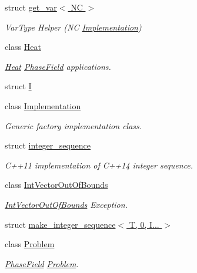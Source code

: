 \begin{DoxyCompactItemize}
struct \hyperlink{structUintah_1_1PhaseField_1_1get__var_3_01NC_01_4}{get\+\_\+var$<$ N\+C $>$}
\begin{DoxyCompactList}\small\item\em Var\+Type Helper (NC \hyperlink{classUintah_1_1PhaseField_1_1Implementation}{Implementation}) \end{DoxyCompactList}\item 
class \hyperlink{classUintah_1_1PhaseField_1_1Heat}{Heat}
\begin{DoxyCompactList}\small\item\em \hyperlink{classUintah_1_1PhaseField_1_1Heat}{Heat} \hyperlink{namespaceUintah_1_1PhaseField}{Phase\+Field} applications. \end{DoxyCompactList}\item 
struct \hyperlink{structUintah_1_1PhaseField_1_1I}{I}
\item 
class \hyperlink{classUintah_1_1PhaseField_1_1Implementation}{Implementation}
\begin{DoxyCompactList}\small\item\em Generic factory implementation class. \end{DoxyCompactList}\item 
struct \hyperlink{structUintah_1_1PhaseField_1_1integer__sequence}{integer\+\_\+sequence}
\begin{DoxyCompactList}\small\item\em C++11 implementation of C++14 integer sequence. \end{DoxyCompactList}\item 
class \hyperlink{classUintah_1_1PhaseField_1_1IntVectorOutOfBounds}{Int\+Vector\+Out\+Of\+Bounds}
\begin{DoxyCompactList}\small\item\em \hyperlink{classUintah_1_1PhaseField_1_1IntVectorOutOfBounds}{Int\+Vector\+Out\+Of\+Bounds} Exception. \end{DoxyCompactList}\item 
struct \hyperlink{structUintah_1_1PhaseField_1_1make__integer__sequence_3_01T_00_010_00_01I_8_8_8_01_4}{make\+\_\+integer\+\_\+sequence$<$ T, 0, I... $>$}
\item 
class \hyperlink{classUintah_1_1PhaseField_1_1Problem}{Problem}
\begin{DoxyCompactList}\small\item\em \hyperlink{namespaceUintah_1_1PhaseField}{Phase\+Field} \hyperlink{classUintah_1_1PhaseField_1_1Problem}{Problem}. \end{DoxyCompactList}\item 

\end{DoxyCompactItemize}
